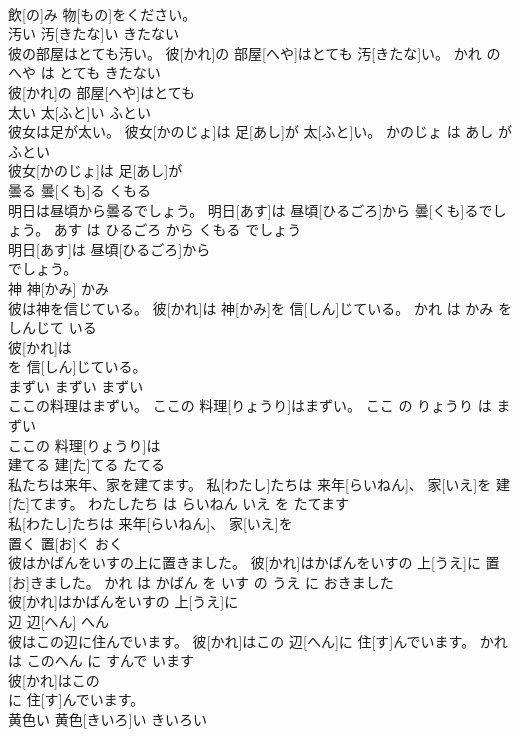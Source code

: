 \documentclass[8pt]{extreport}
\begin{document}
\begin{CJK}{UTF8}{min}
\\	飲[の]み 物[もの]をください。		
\\	汚い	汚[きたな]い	きたない	
\\	彼の部屋はとても汚い。	彼[かれ]の 部屋[へや]はとても 汚[きたな]い。	かれ の へや は とても きたない	
\\	彼[かれ]の 部屋[へや]はとても
\\	太い	太[ふと]い	ふとい	
\\	彼女は足が太い。	彼女[かのじょ]は 足[あし]が 太[ふと]い。	かのじょ は あし が ふとい	
\\	彼女[かのじょ]は 足[あし]が
\\	曇る	曇[くも]る	くもる	
\\	明日は昼頃から曇るでしょう。	明日[あす]は 昼頃[ひるごろ]から 曇[くも]るでしょう。	あす は ひるごろ から くもる でしょう	
\\	明日[あす]は 昼頃[ひるごろ]から
\\	でしょう。		
\\	神	神[かみ]	かみ	
\\	彼は神を信じている。	彼[かれ]は 神[かみ]を 信[しん]じている。	かれ は かみ を しんじて いる	
\\	彼[かれ]は
\\	を 信[しん]じている。		
\\	まずい	まずい	まずい	
\\	ここの料理はまずい。	ここの 料理[りょうり]はまずい。	ここ の りょうり は まずい	
\\	ここの 料理[りょうり]は
\\	建てる	建[た]てる	たてる	
\\	私たちは来年、家を建てます。	私[わたし]たちは 来年[らいねん]、 家[いえ]を 建[た]てます。	わたしたち は らいねん いえ を たてます	
\\	私[わたし]たちは 来年[らいねん]、 家[いえ]を
\\	置く	置[お]く	おく	
\\	彼はかばんをいすの上に置きました。	彼[かれ]はかばんをいすの 上[うえ]に 置[お]きました。	かれ は かばん を いす の うえ に おきました	
\\	彼[かれ]はかばんをいすの 上[うえ]に
\\	辺	辺[へん]	へん	
\\	彼はこの辺に住んでいます。	彼[かれ]はこの 辺[へん]に 住[す]んでいます。	かれ は このへん に すんで います	
\\	彼[かれ]はこの
\\	に 住[す]んでいます。		
\\	黄色い	黄色[きいろ]い	きいろい	

\end{CJK}
\end{document}
